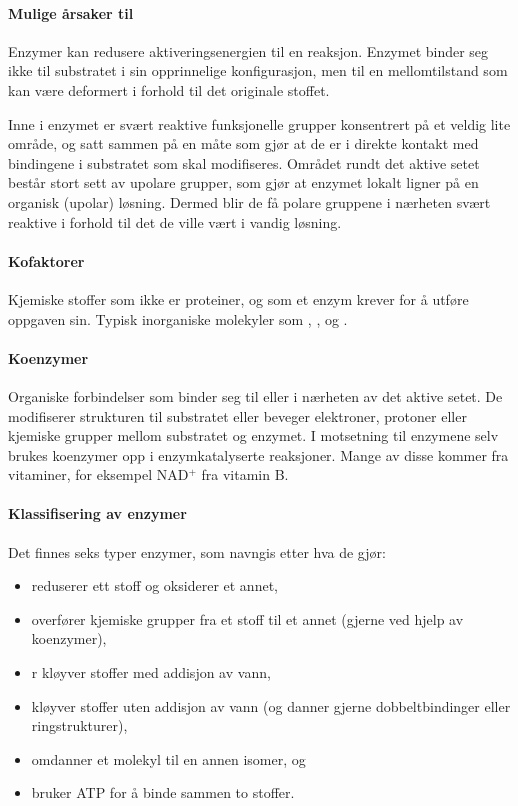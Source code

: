 \paragraph{Mulige årsaker til } Enzymer kan redusere aktiveringsenergien til en reaksjon. Enzymet binder seg ikke til substratet i sin opprinnelige konfigurasjon, men til en mellomtilstand som kan være deformert i forhold til det originale stoffet.

Inne i enzymet er svært reaktive funksjonelle grupper konsentrert på et veldig lite område, og satt sammen på en måte som gjør at de er i direkte kontakt med bindingene i substratet som skal modifiseres. Området rundt det aktive setet består stort sett av upolare grupper, som gjør at enzymet lokalt ligner på en organisk (upolar) løsning. Dermed blir de få polare gruppene i nærheten svært reaktive i forhold til det de ville vært i vandig løsning.

\paragraph{Kofaktorer} Kjemiske stoffer som ikke er proteiner, og som et enzym krever for å utføre oppgaven sin. Typisk inorganiske molekyler som , ,  og .

\paragraph{Koenzymer} Organiske forbindelser som binder seg til eller i nærheten av det aktive setet. De modifiserer strukturen til substratet eller beveger elektroner, protoner eller kjemiske grupper mellom substratet og enzymet. I motsetning til enzymene selv brukes koenzymer opp i enzymkatalyserte reaksjoner. Mange av disse kommer fra vitaminer, for eksempel NAD$^+$ fra vitamin B.

\paragraph{Klassifisering av enzymer} Det finnes seks typer enzymer, som navngis etter hva de gjør:
\begin{itemize}[nolistsep,noitemsep]
	\item {} reduserer ett stoff og oksiderer et annet,
	\item {} overfører kjemiske grupper fra et stoff til et annet (gjerne ved hjelp av koenzymer),
	\item {}r kløyver stoffer med addisjon av vann,
	\item {} kløyver stoffer uten addisjon av vann (og danner gjerne dobbeltbindinger eller ringstrukturer),
	\item {} omdanner et molekyl til en annen isomer, og 
	\item {} bruker ATP for å binde sammen to stoffer.
\end{itemize}

